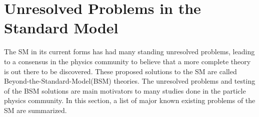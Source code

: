 %
%

%
%
%
%
%




\section{Unresolved Problems in the Standard Model}
\label{sec:UnresolvedSM}
The SM in its current forms has had many standing unresolved problems, leading to a consensus in the physics community to believe that a more complete theory is out there to be discovered. These proposed solutions to the SM are called Beyond-the-Standard-Model(BSM) theories. The unresolved problems and testing of the BSM solutions are main motivators to many studies done in the particle physics community. In this section, a list of major known existing problems of the SM are summarized.

